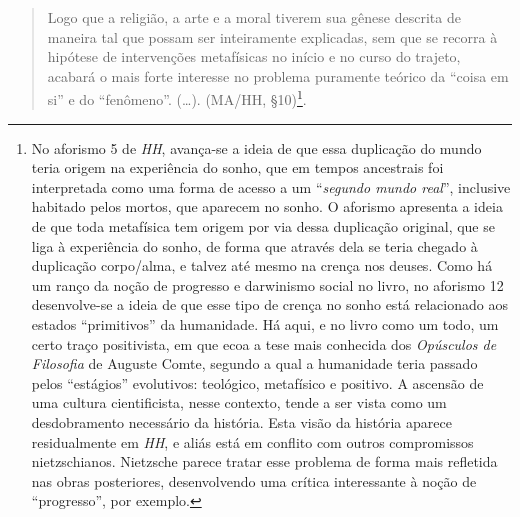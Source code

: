 \documentclass[
	12pt,				%
	openright,			%
	oneside,			%
	a4paper,			%
	english,			%
	french,				%
	spanish,			%
	brazil				%
	]{abntex2}
\begin{document}
	\begin{quotation}
	Logo que a religião, a arte e a moral tiverem sua gênese descrita de maneira tal que possam ser inteiramente explicadas, sem que se recorra à hipótese de intervenções metafísicas no início e no curso do trajeto, acabará o mais forte interesse no problema puramente teórico da “coisa em si” e do “fenômeno”. (…). (MA/HH, §10)\footnote{No aforismo 5 de \textit{HH}, avança-se a ideia de que essa duplicação do mundo teria origem na experiência do sonho, que em tempos ancestrais foi interpretada como uma forma de acesso a um “\textit{segundo mundo real}”, inclusive habitado pelos mortos, que aparecem no sonho. O aforismo apresenta a ideia de que toda metafísica tem origem por via dessa duplicação original, que se liga à experiência do sonho, de forma que através dela se teria chegado à duplicação corpo/alma, e talvez até mesmo na crença nos deuses. Como há um ranço da noção de progresso e darwinismo social no livro, no aforismo 12 desenvolve-se a ideia de que esse tipo de crença no sonho está relacionado aos estados “primitivos” da humanidade. Há aqui, e no livro como um todo, um certo traço positivista, em que ecoa a tese mais conhecida dos \textit{Opúsculos de Filosofia} de Auguste Comte, segundo a qual a humanidade teria passado pelos “estágios” evolutivos: teológico, metafísico e positivo. A ascensão de uma cultura cientificista, nesse contexto, tende a ser vista como um desdobramento necessário da história. Esta visão da história aparece residualmente em \textit{HH}, e aliás está em conflito com outros compromissos nietzschianos. Nietzsche parece tratar esse problema de forma mais refletida nas obras posteriores, desenvolvendo uma crítica interessante à noção de “progresso”, por exemplo.}.
	\end{quotation}
\end{document}
